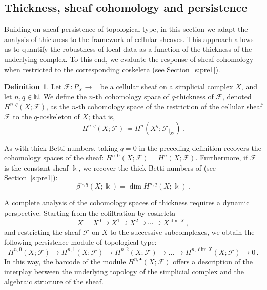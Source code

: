 \documentclass[reqno,12pt]{amsart}
\newcommand{\cF}{{\mathcal F}}
\newcommand{\bbN}{{\mathbb N}}
\DeclareMathOperator{\vect}{\mathbf{vect}_\Bbbk}
\newcommand{\0}{\mathbf 0}
\theoremstyle{definition}
\newtheorem{definition}[theorem]{Definition}
\begin{document}
\subsection{Thickness, sheaf cohomology and persistence}\label{ss:CohHaz}\quad 

Building on sheaf persistence of topological type, in this section we adapt the analysis of thickness to the framework of cellular sheaves. This approach allows us to quantify the robustness of local data as a function of the thickness of the underlying complex. To this end, we evaluate the response of sheaf cohomology when restricted to the corresponding coskeleta (see Section~\ref{s:pre1}).
\begin{definition}
Let $\cF\colon P_X\to \vect$ be a cellular sheaf on a simplicial complex $X$, and let $n,q\in \bbN$. We define the $n$-th cohomology space of $q$-thickness of $\cF$, denoted $H^{n,q}(X;\cF)$, as the $n$-th cohomology space of the restriction of the cellular sheaf $\cF$ to the $q$-coskeleton of $X$; that is,
    \[
    H^{n,q}(X;\cF)\coloneqq H^n(X^q;\cF_{|_{X^q}})\, .
    \]
\end{definition}
As with thick Betti numbers, taking $q=0$ in the preceding definition recovers the cohomology spaces of the sheaf: $H^{n,0}(X;\cF)=H^n(X;\cF)$. Furthermore, if $\cF$ is the constant sheaf $\Bbbk$, we recover the thick Betti numbers of \cite{Pablo_Dani_Dario_25} (see Section~\ref{s:pre1}):
\[
\beta^{n,q}(X;\Bbbk)=\dim H^{n,q}(X;\Bbbk)\,.
\]


A complete analysis of the cohomology spaces of thickness requires a dynamic perspective. Starting from the cofiltration by coskeleta
\[
X=X^0\supseteq X^1\supseteq X^2\supseteq \cdots \supseteq X^{\dim X}\,,
\]
and restricting the sheaf $\cF$ on $X$ to the successive subcomplexes, we obtain the following persistence module of topological type:
\[
H^{n,0}(X;\cF)\to H^{n,1}(X;\cF)\to H^{n,2}(X;\cF)\to \dots\to H^{n,\dim X}(X;\cF)\to 0\, .
\]
In this way, the barcode of the module $H^{n,\bullet}(X;\cF)$ offers a description of the interplay between the underlying topology of the simplicial complex and the algebraic structure of the sheaf.
\end{document}
